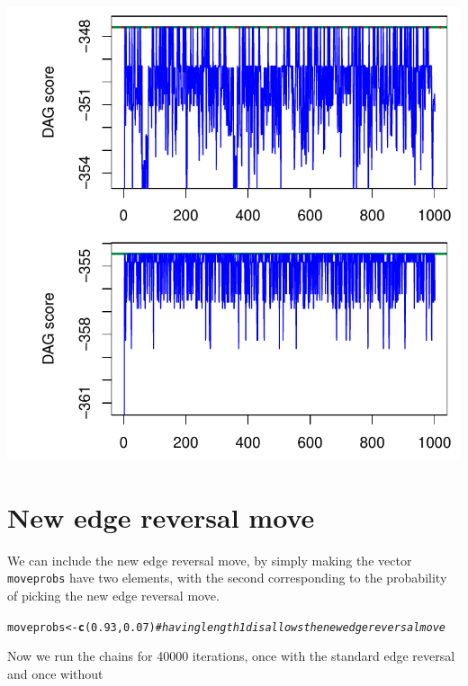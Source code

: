 \documentclass[a4paper]{article}\usepackage[]{graphicx}\usepackage[]{color}
\makeatletter
\def\maxwidth{ %
  \ifdim\Gin@nat@width>\linewidth
    \linewidth
  \else
    \Gin@nat@width
  \fi
}
\newcommand{\hlnum}[1]{\textcolor[rgb]{0.686,0.059,0.569}{#1}}%
\newcommand{\hlcom}[1]{\textcolor[rgb]{0.678,0.584,0.686}{\textit{#1}}}%
\newcommand{\hlstd}[1]{\textcolor[rgb]{0.345,0.345,0.345}{#1}}%
\newcommand{\hlkwb}[1]{\textcolor[rgb]{0.69,0.353,0.396}{#1}}%
\newcommand{\hlkwd}[1]{\textcolor[rgb]{0.737,0.353,0.396}{\textbf{#1}}}%
\newenvironment{kframe}{%
 \def\at@end@of@kframe{}%
 \ifinner\ifhmode%
  \def\at@end@of@kframe{\end{minipage}}%
  \begin{minipage}{\columnwidth}%
 \fi\fi%
 \def\FrameCommand##1{\hskip\@totalleftmargin \hskip-\fboxsep
 \colorbox{shadecolor}{##1}\hskip-\fboxsep
     \hskip-\linewidth \hskip-\@totalleftmargin \hskip\columnwidth}%
 \MakeFramed {\advance\hsize-\width
   \@totalleftmargin\z@ \linewidth\hsize
   \@setminipage}}%
 {\par\unskip\endMakeFramed%
 \at@end@of@kframe}
\newenvironment{knitrout}{}{} %
\newcommand{\nn}{\noindent}
\makeatother
\begin{document}
\begin{knitrout}
{\centering \includegraphics[width=\maxwidth]{figure/minimal-unnamed-chunk-15-1} 

}



\end{knitrout}

\section{New edge reversal move}

We can include the new edge reversal move, by simply making the vector \texttt{moveprobs} have two elements, with the second corresponding to the probability of picking the new edge reversal move.

\begin{knitrout}
\color{fgcolor}\begin{kframe}
\begin{alltt}
\hlstd{moveprobs} \hlkwb{<-} \hlkwd{c}\hlstd{(}\hlnum{0.93}\hlstd{,} \hlnum{0.07}\hlstd{)}  \hlcom{# having length 1 disallows the new edge reversal move}
\end{alltt}
\end{kframe}
\end{knitrout}

\nn Now we run the chains for 40000 iterations, once with the standard edge reversal and once without
\end{document}
